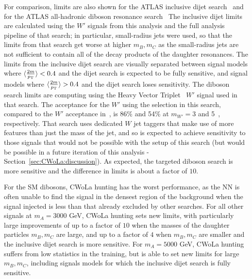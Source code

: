 For comparison, limits are also shown for the ATLAS inclusive dijet search~\cite{Aad:2019hjw} and for the ATLAS all-hadronic diboson resonance search~\cite{Aad:2019fbh}
The inclusive dijet limits are calculated using the $W'$ signals from this analysis and the full analysis pipeline of that search;
in particular, small-radius jets were used, so that the limits from that search get worse at higher $m_B,m_C$ as the small-radius jets are not sufficient to contain all of the decay products of the daughter resonances.
The limits from the inclusive dijet search are visually separated between signal models where $\langle \frac{2m}{p_{\text{T}}}\rangle < 0.4$ and the dijet search is expected to be fully sensitive, and signal models where $\langle \frac{2m}{p_{\text{T}}}\rangle > 0.4$ and the dijet search loses sensitivity.
The diboson search limits are computing using the Heavy Vector Triplet~\cite{Pappadopulo:2014qza} $W'$ signal used in that search.
The acceptance for the $W'$ using the selection in this search, compared to the $W'$ acceptance in~\cite{Aad:2019fbh}, is 86\% and 54\% at $m_{W'}=3$ and 5~\TeV, respectively.
That search uses dedicated $W$ jet taggers that make use of more features than just the mass of the jet, and so is expected to achieve sensitivity to those signals that would not be possible with the setup of this search (but would be possible in a future iteration of this analysis - Section~\ref{sec:CWoLa:discussion}).
As expected, the targeted diboson search is more sensitive and the difference in limits is about a factor of $10$.

For the SM dibosons, CWoLa hunting has the worst performance, as the NN is often unable to find the signal in the densest region of the background when the signal injected is less than that already excluded by other searches.
For all other signals at $m_A=3000$ GeV, CWoLa hunting sets new limits, with particularly large improvements of up to a factor of $10$ when the masses of the daughter particles $m_B,m_C$ are large, and up to a factor of $4$ when $m_B,m_C$ are smaller and the inclusive dijet search is more sensitive.
For $m_A=5000$ GeV, CWoLa hunting suffers from low statistics in the training, but is able to set new limits for large $m_B,m_C$, including signals models for which the inclusive dijet search is fully sensitive.

